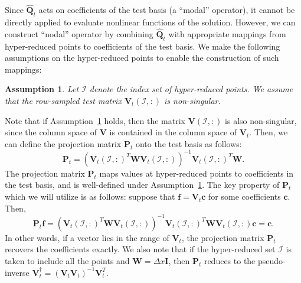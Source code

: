 \documentclass[review]{siamart171218}
\theoremstyle{assumption}
\newtheorem{assumption}{Assumption}
\renewcommand{\hat}{\widehat}
\newcommand{\LRp}[1]{\left( #1 \right)}
\begin{document}
Since $\hat{\bm{Q}}_{t}$ acts on coefficients of the test basis (a ``modal'' operator), it cannot be directly applied to evaluate nonlinear functions of the solution.  However, we can construct ``nodal'' operator by combining $\hat{\bm{Q}}_t$ with appropriate mappings from hyper-reduced points to coefficients of the test basis.  We make the following assumptions on the hyper-reduced points to enable the construction of such mappings: 
\begin{assumption}
Let $\mathcal{I}$ denote the index set of hyper-reduced points.  We assume that the row-sampled test matrix $\bm{V}_t\LRp{\mathcal{I},:}$ is non-singular.  
 \label{ass:quad}
\end{assumption}
Note that if Assumption~\ref{ass:quad} holds, then the matrix $\bm{V}\LRp{\mathcal{I},:}$ is also non-singular, since the column space of $\bm{V}$ is contained in the column space of $\bm{V}_t$.  Then, we can define the projection matrix $\bm{P}_t$ onto the test basis as follows:
\[
\bm{P}_t = \LRp{\bm{V}_t\LRp{\mathcal{I},:}^T\bm{W}\bm{V}_t\LRp{\mathcal{I},:}}^{-1}\bm{V}_t\LRp{\mathcal{I},:}^T\bm{W}.
\]
The projection matrix $\bm{P}_t$ maps values at hyper-reduced points to coefficients in the test basis, and is well-defined under Assumption~\ref{ass:quad}.  The key property of $\bm{P}_t$ which we will utilize is as follows: suppose that $\bm{f} = \bm{V}_t\bm{c}$ for some coefficients $\bm{c}$.  Then,
\begin{equation}
\bm{P}_t \bm{f} = \LRp{\bm{V}_t\LRp{\mathcal{I},:}^T\bm{W}\bm{V}_t\LRp{\mathcal{I},:}}^{-1}\bm{V}_t\LRp{\mathcal{I},:}^T\bm{W} \bm{V}_t\LRp{\mathcal{I},:}\bm{c} = \bm{c}.
\label{eq:preproduce}
\end{equation}
In other words, if a vector lies in the range of $\bm{V}_t$, the projection matrix $\bm{P}_t$ recovers the coefficients exactly.  We also note that if the hyper-reduced set $\mathcal{I}$ is taken to include all the points and $\bm{W} = \Delta x\bm{I}$, then $\bm{P}_t$ reduces to the pseudo-inverse $\bm{V}_t^{\dagger} = \LRp{\bm{V}_t\bm{V}_t}^{-1}\bm{V}_t^T$.  
\end{document}
